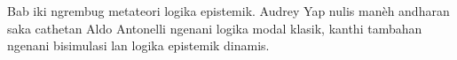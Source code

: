 \documentclass[../../../include/open-logic-chapter]{subfiles}
\begin{document}

\begin{editorial}
Bab iki ngrembug metateori logika epistemik. Audrey Yap nulis manèh andharan saka cathetan Aldo Antonelli ngenani logika modal klasik, kanthi tambahan ngenani bisimulasi lan logika epistemik dinamis.
\end{editorial}



\OLEndChapterHook
\end{document}
